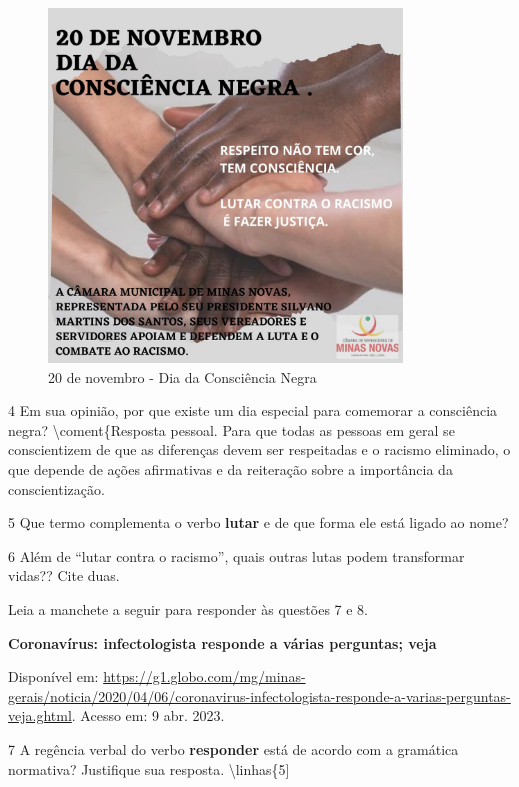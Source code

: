 \begin{itemize}
\begin{itemize}
\begin{figure}
\centering
\includegraphics[width=3.69792in,height=3.69792in]{./_SAEB_9_POR/media/image32.jpeg}
\caption{20 de novembro - Dia da Consciência Negra}
\end{figure}

\num{4} Em sua opinião, por que existe um dia especial para comemorar a
consciência negra?  \textbackslash{}coment\{Resposta pessoal.
Para que todas as pessoas em geral se conscientizem de que as diferenças
devem ser respeitadas e o racismo eliminado, o que depende de ações
afirmativas e da reiteração sobre a importância da conscientização.

\num{5} Que termo complementa o verbo \textbf{lutar} e de que forma ele
está ligado ao nome? 

\num{6} Além de ``lutar contra o racismo'', quais outras lutas podem
transformar vidas?? Cite duas. 

Leia a manchete a seguir para responder às questões 7 e 8.

\textbf{Coronavírus: infectologista responde a várias perguntas; veja}

Disponível em:
\url{https://g1.globo.com/mg/minas-gerais/noticia/2020/04/06/coronavirus-infectologista-responde-a-varias-perguntas-veja.ghtml}.
Acesso em: 9 abr. 2023.

\num{7} A regência verbal do verbo \textbf{responder} está de acordo com
a gramática normativa? Justifique sua resposta.
\textbackslash{}linhas\{5{]} 


\end{itemize}
\end{itemize}
